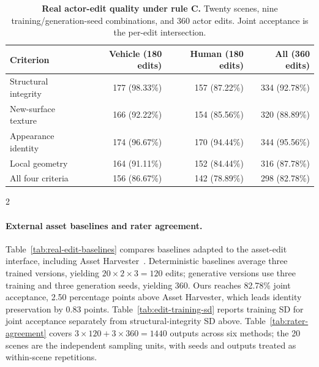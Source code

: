 \begin{table}[H]
\centering\small
\caption{\textbf{Real actor-edit quality under rule C.} Twenty scenes, nine training/generation-seed combinations, and 360 actor edits. Joint acceptance is the per-edit intersection.}
\label{tab:real-edit-quality}
\begin{tabular}{@{}lrrr@{}}
\toprule
Criterion & Vehicle (180 edits) & Human (180 edits) & All (360 edits)\\
\midrule
Structural integrity & 177 (98.33\%) & 157 (87.22\%) & 334 (92.78\%)\\
New-surface texture & 166 (92.22\%) & 154 (85.56\%) & 320 (88.89\%)\\
Appearance identity & 174 (96.67\%) & 170 (94.44\%) & 344 (95.56\%)\\
Local geometry & 164 (91.11\%) & 152 (84.44\%) & 316 (87.78\%)\\
All four criteria & 156 (86.67\%) & 142 (78.89\%) & 298 (82.78\%)\\
\bottomrule
\end{tabular}
\end{table}
\begin{multicols}{2}

\paragraph{External asset baselines and rater agreement.}
Table~\ref{tab:real-edit-baselines} compares baselines adapted to the asset-edit interface, including Asset Harvester~\cite{cao2026assetharvester}. Deterministic baselines average three trained versions, yielding $20\times2\times3=120$ edits; generative versions use three training and three generation seeds, yielding 360. Ours reaches 82.78\% joint acceptance, 2.50 percentage points above Asset Harvester, which leads identity preservation by 0.83 points. Table~\ref{tab:edit-training-sd} reports training SD for joint acceptance separately from structural-integrity SD above. Table~\ref{tab:rater-agreement} covers $3\times120+3\times360=1440$ outputs across six methods; the 20 scenes are the independent sampling units, with seeds and outputs treated as within-scene repetitions.

\end{multicols}
